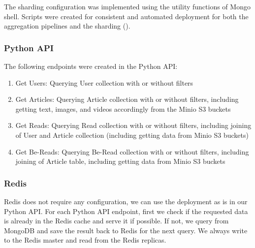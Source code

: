 \documentclass{report}
\begin{document}
    The sharding configuration was implemented using the utility functions of Mongo shell. Scripts were created for consistent and automated deployment for both the aggregation pipelines and the sharding ().

    \subsubsection{Python API}
    The following endpoints were created in the Python API:
    \begin{enumerate}
        \item Get Users: Querying User collection with or without filters
        \item Get Articles: Querying Article collection with or without filters, including getting text, images, and videos accordingly from the Minio S3 buckets
        \item Get Reads: Querying Read collection with or without filters, including joining of User and Article collection (including getting data from Minio S3 buckets)
        \item Get Be-Reads: Querying Be-Read collection with or without filters, including joining of Article table, including getting data from Minio S3 buckets
    \end{enumerate}

    \subsubsection{Redis}
    Redis does not require any configuration, we can use the deployment as is in our Python API. For each Python API endpoint, first we check if the requested data is already in the Redis cache and serve it if possible. If not, we query from MongoDB and save the result back to Redis for the next query. We always write to the Redis master and read from the Redis replicas.
\end{document}
